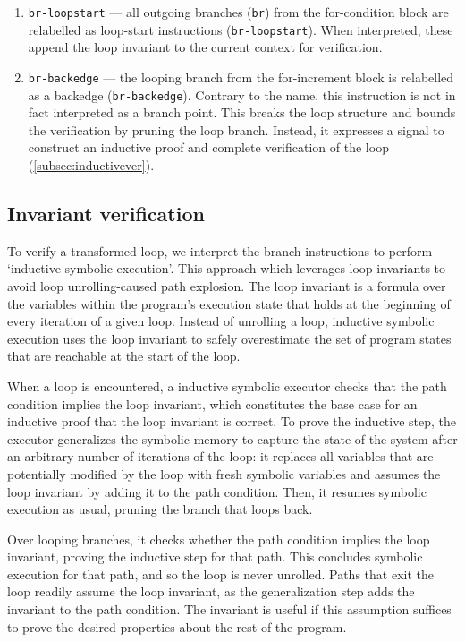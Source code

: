 \documentclass[11pt,a4paper,runningheads]{llncs}
\begin{document}
\begin{enumerate}
    \item \texttt{br-loopstart} --- all outgoing branches (\texttt{br}) from the
    for-condition block are relabelled as loop-start instructions
    (\texttt{br-loopstart}). When interpreted, these append the loop invariant
    to the current context for verification.
    \item \texttt{br-backedge} --- the looping branch from the for-increment
    block is relabelled as a backedge (\texttt{br-backedge}). Contrary to the
    name, this instruction is not in fact interpreted as a branch point. This
    breaks the loop structure and bounds the verification by pruning the loop
    branch. Instead, it expresses a signal to construct an inductive proof and
    complete verification of the loop (\autoref{subsec:inductivever}).
\end{enumerate}

\subsection{Invariant verification}
\label{subsec:inductivever}

To verify a transformed loop, we interpret the branch instructions to perform
`inductive symbolic execution'. This approach which leverages loop invariants to
avoid loop unrolling-caused path explosion. The loop invariant is a formula over
the variables within the program's execution state that holds at the beginning
of every iteration of a given loop. Instead of unrolling a loop, inductive
symbolic execution uses the loop invariant to safely overestimate the set of
program states that are reachable at the start of the loop.

When a loop is encountered, a inductive symbolic executor checks that the path
condition implies the loop invariant, which constitutes the base case for an
inductive proof that the loop invariant is correct. To prove the inductive step,
the executor generalizes the symbolic memory to capture the state of the system
after an arbitrary number of iterations of the loop: it replaces all variables
that are potentially modified by the loop with fresh symbolic variables and
assumes the loop invariant by adding it to the path condition. Then, it resumes
symbolic execution as usual, pruning the branch that loops back.

Over looping branches, it checks whether the path condition implies the loop
invariant, proving the inductive step for that path. This concludes symbolic
execution for that path, and so the loop is never unrolled. Paths that exit the
loop readily assume the loop invariant, as the generalization step adds the
invariant to the path condition. The invariant is useful if this assumption
suffices to prove the desired properties about the rest of the program.
\end{document}
